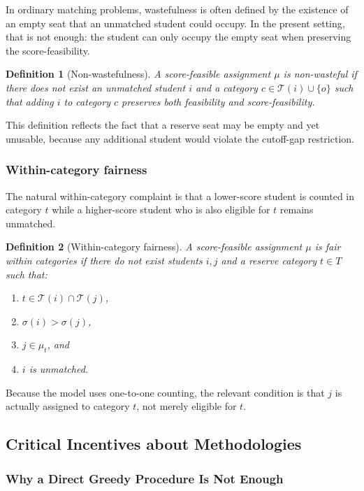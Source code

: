 \documentclass[12pt]{article}
\newtheorem{definition}{Definition}
\newcommand{\T}{\mathcal{T}}
\newcommand{\1}{\mathbf{1}}
\begin{document}
In ordinary matching problems, wastefulness is often defined by the existence of an empty seat that an unmatched student could occupy. In the present setting, that is not enough: the student can only occupy the empty seat when preserving the score-feasibility.

\begin{definition}[Non-wastefulness]
A score-feasible assignment $\mu$ is non-wasteful if there does not exist an unmatched student $i$ and a category $c\in \T(i)\cup\{o\}$ such that adding $i$ to category $c$ preserves both feasibility and score-feasibility.
\end{definition}

This definition reflects the fact that a reserve seat may be empty and yet unusable, because any additional student would violate the cutoff-gap restriction.

\subsubsection{Within-category fairness}

The natural within-category complaint is that a lower-score student is counted in category $t$ while a higher-score student who is also eligible for $t$ remains unmatched.

\begin{definition}[Within-category fairness]
A score-feasible assignment $\mu$ is fair within categories if there do not exist students $i,j$ and a reserve category $t\in T$ such that:
\begin{enumerate}
\item $t\in\T(i)\cap\T(j)$,
\item $\sigma(i)>\sigma(j)$,
\item $j\in\mu_t$, and
\item $i$ is unmatched.
\end{enumerate}
\end{definition}

Because the model uses one-to-one counting, the relevant condition is that $j$ is actually assigned to category $t$, not merely eligible for $t$.

\subsection{Critical Incentives about Methodologies}
\subsubsection{Why a Direct Greedy Procedure Is Not Enough}
\end{document}
